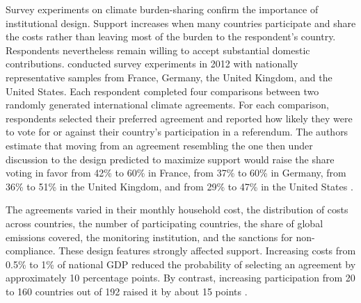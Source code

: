\documentclass[11pt,a4paper]{article}
\begin{document}
Survey experiments on climate burden-sharing confirm the importance of institutional design. Support increases when many countries participate and share the costs rather than leaving most of the burden to the respondent's country. Respondents nevertheless remain willing to accept substantial domestic contributions. \citet{bechtel_mass_2013} conducted survey experiments in 2012 with nationally representative samples from France, Germany, the United Kingdom, and the United States. Each respondent completed four comparisons between two randomly generated international climate agreements. For each comparison, respondents selected their preferred agreement and reported how likely they were to vote for or against their country's participation in a referendum. The authors estimate that moving from an agreement resembling the one then under discussion to the design predicted to maximize support would raise the share voting in favor from 42\% to 60\% in France, from 37\% to 60\% in Germany, from 36\% to 51\% in the United Kingdom, and from 29\% to 47\% in the United States \citep[Table S3]{bechtel_mass_2013}.


The agreements varied in their monthly household cost, the distribution of costs across countries, the number of participating countries, the share of global emissions covered, the monitoring institution, and the sanctions for non-compliance. These design features strongly affected support. Increasing costs from 0.5\% to 1\% of national GDP reduced the probability of selecting an agreement by approximately 10 percentage points. By contrast, increasing participation from 20 to 160 countries out of 192 raised it by about 15 points \citep[Table 1 \& Figure 2]{bechtel_mass_2013}.
\end{document}
